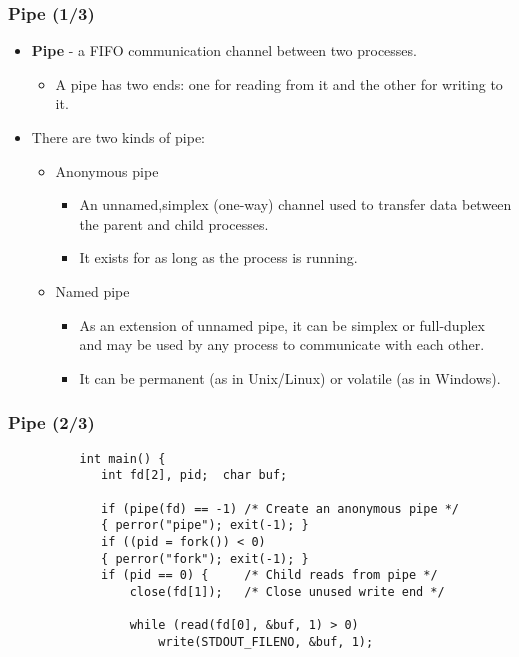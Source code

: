 \documentclass[CJKutf8,dvipsnames,table]{beamer}
\begin{document}
\begin{CJK*}{UTF8}{song}
  \begin{frame}
  \frametitle{Pipe (1/3)} \pause
  \begin{itemize}
  \item{\textbf{Pipe} \pause - a FIFO communication channel between two processes.} \pause
    \begin{itemize}
    \item{A pipe has two ends: one for reading from it and the other for writing to it.} \pause
    \end{itemize}
  \item{There are two kinds of pipe:} \pause
    \begin{itemize}
    \item{Anonymous pipe} \pause
      \begin{itemize}
      \item{An unnamed,simplex (one-way) channel used to transfer data between the parent and child processes.} \pause
      \item{It exists for as long as the process is running.} \pause
      \end{itemize}
    \item{Named pipe} \pause
      \begin{itemize}
      \item{As an extension of unnamed pipe, it can be simplex or full-duplex and may be used by any process to communicate with each other.} \pause
      \item{It can be permanent (as in Unix/Linux) or volatile (as in Windows).}
      \end{itemize}
    \end{itemize}
  \end{itemize}
  \end{frame}

  \begin{frame}[fragile]%
  \frametitle{Pipe (2/3)} \pause
\begin{lstlisting}
          int main() {
             int fd[2], pid;  char buf;
             
             if (pipe(fd) == -1) /* Create an anonymous pipe */
             { perror("pipe"); exit(-1); }
             if ((pid = fork()) < 0)
             { perror("fork"); exit(-1); }
             if (pid == 0) {     /* Child reads from pipe */
                 close(fd[1]);   /* Close unused write end */

                 while (read(fd[0], &buf, 1) > 0)
                     write(STDOUT_FILENO, &buf, 1);


\end{lstlisting}
\end{frame}
\end{CJK*}
\end{document}
